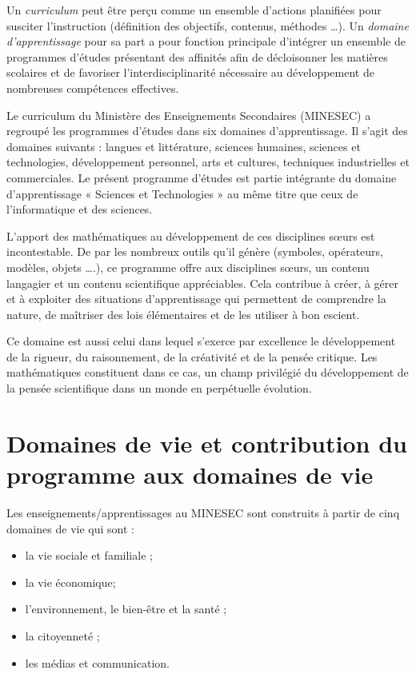 Un \textit{curriculum} peut être perçu comme un ensemble d'actions planifiées pour susciter l'instruction (définition des objectifs, contenus, méthodes …). Un \textit{domaine d'apprentissage} pour sa part a pour fonction principale d'intégrer un ensemble de programmes d'études présentant des affinités afin de décloisonner les matières scolaires et de favoriser l'interdisciplinarité nécessaire au développement de nombreuses compétences effectives.

Le curriculum du Ministère des Enseignements Secondaires (MINESEC) a regroupé les programmes d'études dans six domaines d'apprentissage. Il s'agit des domaines suivants : langues et littérature, sciences humaines, sciences et technologies, développement personnel, arts et cultures, techniques industrielles et commerciales. Le présent programme d'études est partie intégrante du domaine d'apprentissage « Sciences et Technologies » au même titre que ceux de l'informatique et des sciences.

L'apport des mathématiques au développement de ces disciplines sœurs est incontestable. De par les nombreux outils qu'il génère (symboles, opérateurs, modèles, objets ….), ce programme offre aux disciplines sœurs, un contenu langagier et un contenu scientifique appréciables. Cela contribue à créer, à gérer et à exploiter des situations d'apprentissage qui permettent de comprendre la nature, de maîtriser des lois élémentaires et de les utiliser à bon escient.

Ce domaine est aussi celui dans lequel s'exerce par excellence le développement de la rigueur, du raisonnement, de la créativité et de la pensée critique. Les mathématiques constituent dans ce cas, un champ privilégié du développement de la pensée scientifique dans un monde en perpétuelle évolution.

\section*{Domaines de vie et contribution du programme aux domaines de vie}

Les enseignements/apprentissages au MINESEC sont construits à partir de cinq domaines de vie qui sont : 
\begin{itemize}
\item la vie sociale et familiale ; 
\item la vie économique; 
\item l'environnement, le bien-être et la santé ; 
\item la citoyenneté ; 
\item les médias et communication.
\end{itemize}

